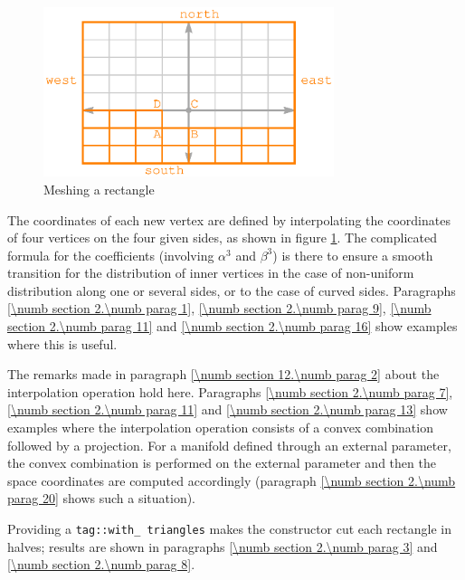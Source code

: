 \begin{figure}[ht] \centering
  \includegraphics[width=85mm]{fig-rectangle}
  \caption{Meshing a rectangle}
  \label{\numb section 12.\numb fig 1}
\end{figure}

The coordinates of each new vertex are defined by interpolating the coordinates of four vertices
on the four given sides, as shown in figure \ref{\numb section 12.\numb fig 1}.
The complicated formula for the coefficients (involving $ \alpha^3 $ and $ \beta^3 $) is there
to ensure a smooth transition for the distribution of inner vertices in the case of non-uniform
distribution along one or several sides, or to the case of curved sides.
Paragraphs \ref{\numb section 2.\numb parag 1}, \ref{\numb section 2.\numb parag 9},
\ref{\numb section 2.\numb parag 11} and \ref{\numb section 2.\numb parag 16} show
examples where this is useful.

The remarks made in paragraph \ref{\numb section 12.\numb parag 2} about
the interpolation operation hold here.
Paragraphs \ref{\numb section 2.\numb parag 7}, \ref{\numb section 2.\numb parag 11} and
\ref{\numb section 2.\numb parag 13} show examples where the interpolation operation
consists of a convex combination followed by a projection.
For a manifold defined through an external parameter, the convex combination is performed
on the external parameter and then the space coordinates are computed accordingly
(paragraph \ref{\numb section 2.\numb parag 20} shows such a situation).

Providing a {\small\tt \textcolor{tag}{tag}::with\_\,triangles} makes the constructor
cut each rectangle in halves; results are shown in paragraphs \ref{\numb section 2.\numb parag 3}
and \ref{\numb section 2.\numb parag 8}.

